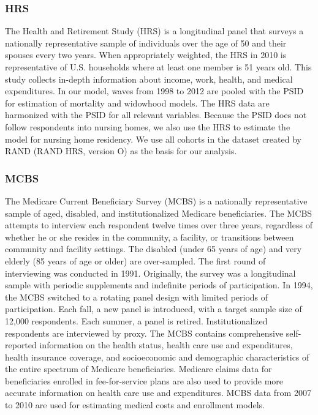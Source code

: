 \subsubsection{HRS}

\noindent The Health and Retirement Study (HRS) is a longitudinal panel that surveys a nationally representative sample of individuals over the age of 50 and their spouses every two years. When appropriately weighted, the HRS in 2010 is representative of U.S. households
where at least one member is 51 years old.
This study collects in-depth information about income, work, health, and medical expenditures. In our model, waves from 1998 to 2012 are pooled with the PSID for estimation of mortality and
widowhood models. The HRS data
are harmonized with the PSID for all relevant variables. Because the PSID does not follow respondents into nursing homes, we also use the HRS to estimate the model for nursing home residency. We use all cohorts in the dataset created by RAND (RAND HRS, version O) as the basis
for our analysis.

\subsubsection{MCBS}
\noindent The Medicare Current Beneficiary Survey (MCBS) is a nationally representative sample of aged, disabled,
and institutionalized Medicare beneficiaries. The MCBS attempts to interview each respondent twelve
times over three years, regardless of whether he or she resides in the community, a facility, or
transitions between community and facility settings. The disabled (under 65 years of age) and
very elderly (85 years of age or older) are over-sampled. The first round of interviewing was conducted
in 1991. Originally, the survey was a longitudinal sample with periodic supplements and indefinite
periods of participation. In 1994, the MCBS switched to a rotating panel design with limited periods
of participation. Each fall, a new panel is introduced, with a target sample size of 12,000 respondents. Each summer, a panel is retired. Institutionalized respondents are interviewed by proxy. The MCBS
contains comprehensive self-reported information on the health status, health care use and
expenditures, health insurance coverage, and socioeconomic and demographic characteristics of the
entire spectrum of Medicare beneficiaries. Medicare claims data for beneficiaries enrolled in
fee-for-service plans are also used to provide more accurate information on health care use and
expenditures. MCBS data from 2007 to 2010 are used for estimating medical costs and enrollment models.

